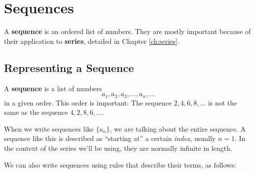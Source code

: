 \chapter{Sequences}
\label{ch:sequences}

%
A \textbf{sequence} is an ordered list of numbers. They are mostly important because of their application to \textbf{series},
detailed in Chapter \ref{ch:series}.
\section{Representing a Sequence}
\begin{defn}
  A \textbf{sequence} is a list of numbers
  \[ a_1, a_2, a_3, \ldots, a_n, \ldots\]
  in a given order. This order is important: The sequence \(2, 4, 6, 8, \ldots\) is not the same as the sequence \(4, 2, 8, 6, \ldots\).
\end{defn}
When we write sequences like \(\{a_n\}\), we are talking about the entire
sequence. A sequence like this is described as ``starting at'' a certain \emph{index},
usually \(n=1\). In the context of the series we'll be using, they are normally infinite
in length.

We can also write sequences using rules that describe their
terms, as follows:

